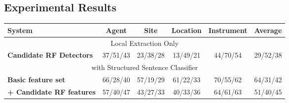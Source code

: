 \subsection{Experimental Results}

\begin{table}[t]
\footnotesize
\centering
\begin{tabular}[center]{|l|cccc|c|} \hline
{\bf System} & {\bf Agent} & {\bf Site} & {\bf Location} & {\bf Instrument}  & {\bf Average} \\ \hline
\multicolumn{6}{|c|}{Local Extraction Only} \\ \hline
{\bf Candidate RF Detectors} & 37/51/43 & 23/38/28 & 13/49/21 & 44/70/54 & 29/52/38 \\ \hline
\multicolumn{6}{|c|}{with Structured Sentence Classifier} \\ \hline
{\bf Basic feature set}  & 66/28/40 & 57/19/29 & 61/22/33 & 70/55/62 & 64/31/42\\ \hline
{\bf + Candidate RF features} & 57/40/47 & 43/27/33 & 40/33/36 & 64/61/63 & 51/40/45 \\ \hline

\end{tabular}
\end{table}
